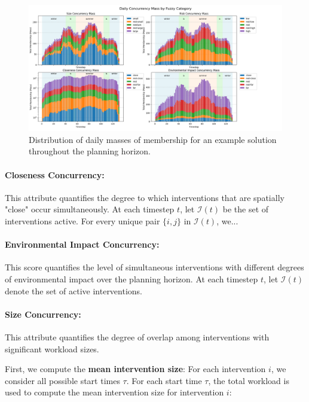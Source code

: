 \begin{figure}[!ht]
    \begin{adjustwidth}{-1.6cm}{-1.6cm}
    \includegraphics[width=1.07\linewidth]{ch3/figures/Fuzzy_att_concurrency.png}
    \end{adjustwidth}
    \caption{Distribution of daily masses of membership for an example solution throughout the planning horizon.}
    \label{fig:fuzzy_att_concurrency}
\end{figure}



\paragraph{Closeness Concurrency:} This attribute quantifies the degree to which interventions that are spatially "close" occur simultaneously. At each timestep \(t\), let \(\mathcal{I}(t)\) be the set of interventions active. For every unique pair \(\{i,j\}\) in \(\mathcal{I}(t)\), we...


\paragraph{Environmental Impact Concurrency:} This score quantifies the level of simultaneous interventions with different degrees of environmental impact over the planning horizon. At each timestep \(t\), let \(\mathcal{I}(t)\) denote the set of active interventions. 

\paragraph{Size Concurrency:} This attribute quantifies the degree of overlap among interventions with significant workload sizes. 

First, we compute the \textbf{mean intervention size}: For each intervention \(i\), we consider all possible start times \(\tau\). For each start time \(\tau\), the total workload is used to compute the mean intervention size for intervention \(i\):

